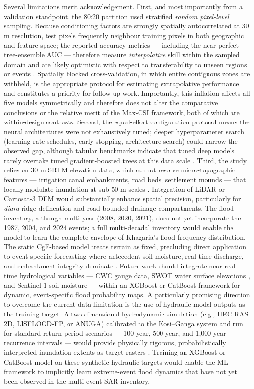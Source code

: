 \documentclass[12pt, a4paper]{article}
\begin{document}
Several limitations merit acknowledgement. First, and most importantly from a validation standpoint, the 80:20 partition used stratified \textit{random pixel-level} sampling. Because conditioning factors are strongly spatially autocorrelated at 30 m resolution, test pixels frequently neighbour training pixels in both geographic and feature space; the reported accuracy metrics --- including the near-perfect tree-ensemble AUC --- therefore measure \textit{interpolative} skill within the sampled domain and are likely optimistic with respect to transferability to unseen regions or events \citep{roberts2017, ploton2020}. Spatially blocked cross-validation, in which entire contiguous zones are withheld, is the appropriate protocol for estimating extrapolative performance and constitutes a priority for follow-up work. Importantly, this inflation affects all five models symmetrically and therefore does not alter the comparative conclusions or the relative merit of the Max-CSI framework, both of which are within-design contrasts. Second, the equal-effort configuration protocol means the neural architectures were not exhaustively tuned; deeper hyperparameter search (learning-rate schedules, early stopping, architecture search) could narrow the observed gap, although tabular benchmarks indicate that tuned deep models rarely overtake tuned gradient-boosted trees at this data scale \citep{grinsztajn2022, shwartzziv2022, mcelfresh2023}. Third, the study relies on 30 m SRTM elevation data, which cannot resolve micro-topographic features --- irrigation canal embankments, road beds, settlement mounds --- that locally modulate inundation at sub-50 m scales \citep{neal2021, Hawker2022}. Integration of LiDAR or Cartosat-3 DEM would substantially enhance spatial precision, particularly for \textit{diara} ridge delineation and road-bounded drainage compartments. The flood inventory, although multi-year (2008, 2020, 2021), does not yet incorporate the 1987, 2004, and 2024 events; a full multi-decadal inventory would enable the model to learn the complete envelope of Khagaria's flood frequency distribution. The static CgF-based model treats terrain as fixed, precluding direct application to event-specific forecasting where antecedent soil moisture, real-time discharge, and embankment integrity dominate \citep{sinha2008, mishra2018}. Future work should integrate near-real-time hydrological variables --- CWC gauge data, SWOT water surface elevations \citep{Biancamaria2016}, and Sentinel-1 soil moisture --- within an XGBoost or CatBoost framework for dynamic, event-specific flood probability maps. A particularly promising direction to overcome the current data limitation is the use of hydraulic model outputs as the training target. A two-dimensional hydrodynamic simulation (e.g., HEC-RAS 2D, LISFLOOD-FP, or ANUGA) calibrated to the Kosi--Ganga system and run for standard return-period scenarios --- 100-year, 500-year, and 1,000-year recurrence intervals --- would provide physically rigorous, probabilistically interpreted inundation extents as target rasters \citep{teng2017, Bates2010}. Training an XGBoost or CatBoost model on these synthetic hydraulic targets would enable the ML framework to implicitly learn extreme-event flood dynamics that have not yet been observed in the multi-event SAR inventory, 
\end{document}
